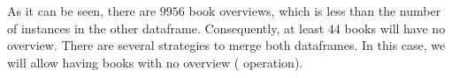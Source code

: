 \documentclass[letterpaper,10pt,english]{sphinxmanual}
\begin{document}
As it can be seen, there are \(9956\) book overviews, which is less than the number of instances in the other dataframe. Consequently, at least \(44\) books will have no overview. There are several strategies to merge both dataframes. In this case, we will allow having books with no overview ( operation).

{
\begin{sphinxVerbatim}[commandchars=\\\{\}]
\llap{\color{nbsphinxin}[16]:\,\hspace{\fboxrule}\hspace{\fboxsep}}      
\end{sphinxVerbatim}
}
\end{document}
